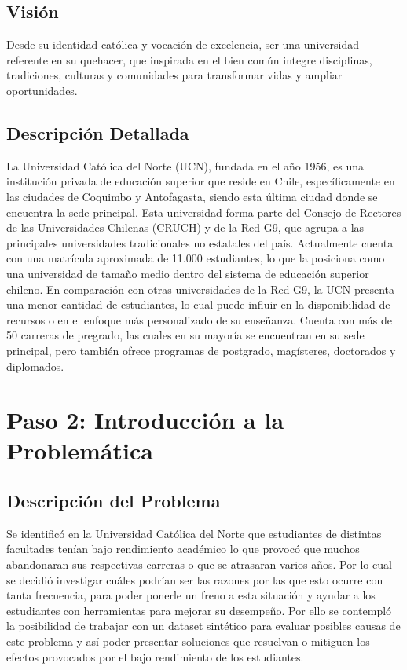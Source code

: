 \documentclass[12pt,letterpaper]{report}
\begin{document}
\subsection{Visión}
Desde su identidad católica y vocación de excelencia, ser una universidad referente en su quehacer, que inspirada en el bien común integre disciplinas, tradiciones, culturas y comunidades para transformar vidas y ampliar oportunidades. 

\subsection{Descripción Detallada}
La Universidad Católica del Norte (UCN), fundada en el año 1956, es una institución privada de educación superior que reside en Chile, específicamente en las ciudades de Coquimbo y Antofagasta, siendo esta última ciudad donde se encuentra la sede principal. Esta universidad forma parte del Consejo de Rectores de las Universidades Chilenas (CRUCH) y de la Red G9, que agrupa a las principales universidades tradicionales no estatales del país. Actualmente cuenta con una matrícula aproximada de 11.000 estudiantes, lo que la posiciona como una universidad de tamaño medio dentro del sistema de educación superior chileno. En comparación con otras universidades de la Red G9, la UCN presenta una menor cantidad de estudiantes, lo cual puede influir en la disponibilidad de recursos o en el enfoque más personalizado de su enseñanza. Cuenta con más de 50 carreras de pregrado, las cuales en su mayoría se encuentran en su sede principal, pero también ofrece programas de postgrado, magísteres, doctorados y diplomados.
\section{Paso 2: Introducción a la Problemática}

\subsection{Descripción del Problema}
Se identificó en la Universidad Católica del Norte que estudiantes de distintas facultades tenían bajo rendimiento académico lo que provocó que muchos abandonaran sus respectivas carreras o que se atrasaran varios años. Por lo cual se decidió investigar cuáles podrían ser las razones por las que esto ocurre con tanta frecuencia, para poder ponerle un freno a esta situación y ayudar a los estudiantes con herramientas para mejorar su desempeño. Por ello se contempló la posibilidad de trabajar con un dataset sintético para evaluar posibles causas de este problema y así poder presentar soluciones que resuelvan o mitiguen los efectos provocados por el bajo rendimiento de los estudiantes.
\end{document}
